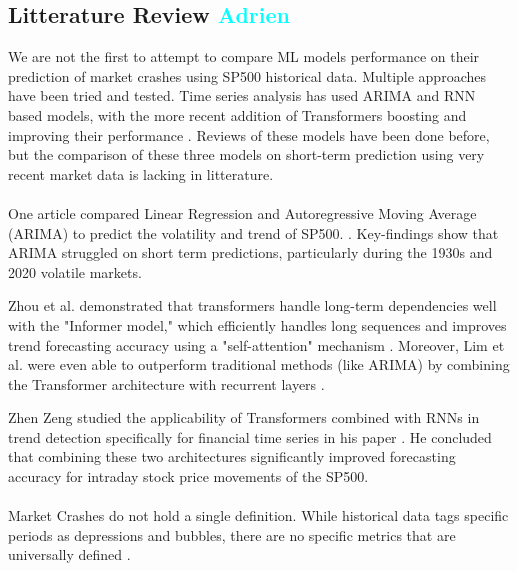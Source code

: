 \documentclass[12pt, letterpaper]{article}
\begin{document}
\subsection*{Litterature Review \textcolor{cyan}{Adrien}}
    We are not the first to attempt to compare ML models performance on their prediction of market crashes using SP500 historical data. Multiple approaches have been tried and tested. Time series analysis has used ARIMA and RNN based models, with the more recent addition of Transformers boosting and improving their performance  \cite{Okpeke, Ahmed, ArunKumar}. Reviews of these models have been done before, but the comparison of these three models on short-term prediction using very recent market data is lacking in litterature. 
    \paragraph*{}
    One article compared Linear Regression and Autoregressive Moving Average (ARIMA) to predict the volatility and trend of SP500. \cite{sp500arimalstmregression}. 
    Key-findings show that ARIMA struggled on short term predictions, particularly during the 1930s and 2020 volatile markets. 
    
    Zhou et al. demonstrated that transformers handle long-term dependencies well with the "Informer model," which efficiently handles long sequences and improves trend forecasting accuracy using a "self-attention" mechanism \cite{zhou2021informer}. Moreover, Lim et al. were even able to outperform traditional methods (like ARIMA) by combining the Transformer architecture with recurrent layers \cite{lim2021temporal}. 
    
    Zhen Zeng studied the applicability of Transformers combined with RNNs in trend detection specifically for financial time series in his paper \cite{zeng2023financial}. He concluded that combining these two architectures significantly improved forecasting accuracy for intraday stock price movements of the SP500.
    \paragraph*{}
    Market Crashes do not hold a single definition. While historical data tags specific periods as depressions and bubbles, there are no specific metrics that are universally defined \cite{Fonville, Investo}. 
\end{document}
